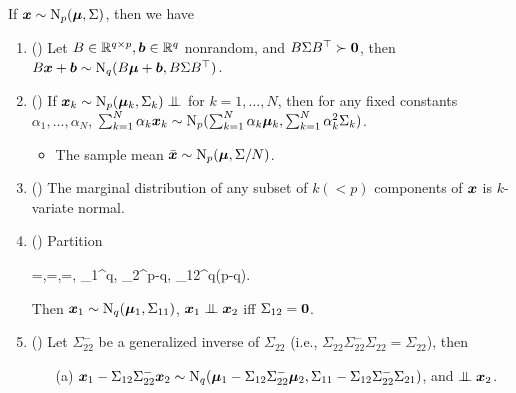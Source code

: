 \documentclass[10pt,a4paper]{book}
\begin{document}
\begin{thmbox}
	\begin{theorem}\label{thm:multi_normal_prop}
		If ${\boldsymbol x}\sim\mathrm{N}_p({\boldsymbol\mu},\Sigma)$, then we have 
		\begin{enumerate}
			\item () Let $B\in\mathbb R^{q\times p}, {\boldsymbol b}\in\mathbb R^{q}$ nonrandom, and $B\Sigma B^\top\succ {\boldsymbol 0}$, then $B{\boldsymbol x}+{\boldsymbol b} \sim \mathrm{N}_q (B{\boldsymbol\mu}+{\boldsymbol b},B\Sigma B^\top)$.  
			\item () If $\x_k\sim\rmN_p(\bam_k,\Sigma_k)\indep$ for $k=1,\ldots,N$, then for any fixed constants $\alpha_1,\ldots,\alpha_N$, $\sum_{k=1}^N\alpha_k{\boldsymbol x}_k\sim\mathrm{N}_p(\sum_{k=1}^{N}\alpha_k{\boldsymbol\mu}_k,\sum_{k=1}^{N}\alpha_k^2\Sigma_k)$.
			\begin{itemize}
				\item The sample mean $\bar{{\boldsymbol x}}\sim\mathrm{N}_p({\boldsymbol\mu},\Sigma/N)$. 
			\end{itemize}
			\item () The marginal distribution of any subset of $k(<p)$ components of ${\boldsymbol x}$ is $k$-variate normal.   
			\item () Partition
			\begin{sequation*}
				\x=\left[{\begin{array}{c}\x_{1}\\\x_{2}\end{array}}\right],\quad\boldsymbol{\mu}=,\quad\boldsymbol{\Sigma}=, \quad \x_1\in\bbR^{q}, \x_2\in\bbR^{p-q}, \Sigma_{12}\in\bbR^{q\times(p-q)}.
			\end{sequation*}    
			Then ${\boldsymbol x}_1\sim\mathrm{N}_q({\boldsymbol\mu}_1,\Sigma_{11})$, $\x_1\indep\x_2$ iff $\Sigma_{12}={\boldsymbol 0}$. 
			\item () Let $\Sigma_{22}^{-}$ be a generalized inverse of $\Sigma_{22}$ (i.e., $\Sigma_{22}\Sigma_{22}^-\Sigma_{22}=\Sigma_{22}$), then 
			\begin{itemize}
				\item[(a)] ${\boldsymbol x}_1-\Sigma_{12}\Sigma_{22}^-{\boldsymbol x}_2\sim \mathrm{N}_q({\boldsymbol\mu}_1-\Sigma_{12}\Sigma_{22}^-{\boldsymbol\mu}_2,\Sigma_{11}-\Sigma_{12}\Sigma_{22}^-\Sigma_{21})$, and $\indep \x_2$.

\end{itemize}
\end{enumerate}
\end{theorem}
\end{thmbox}
\end{document}

